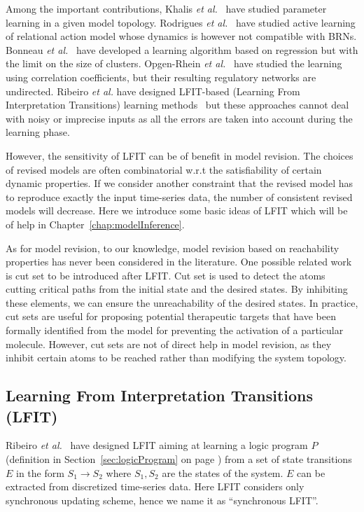 Among the important contributions, Khalis \textit{et al.}~\cite{khalis2009smbionet} have studied parameter learning in a given model topology.
Rodrigues \textit{et al.}~\cite{rodrigues2011active} have studied active learning of relational action model whose dynamics is however not compatible with BRNs.
Bonneau \textit{et al.}~\cite{bonneau2006inferelator} have developed a learning algorithm based on regression but with the limit on the size of clusters.
Opgen-Rhein \textit{et al.}~\cite{opgen2007correlation} have studied the learning using correlation coefficients, but their resulting regulatory networks are undirected. 
Ribeiro \textit{et al.} have designed LFIT-based (Learning From Interpretation Transitions) learning methods~\cite{ribeiro2015learning,ribeiro2018learning,ribeiro2017inductive} but these approaches cannot deal with noisy or imprecise inputs as all the errors are taken into account during the learning phase.

However, the sensitivity of LFIT can be of benefit in model revision.
The choices of revised models are often combinatorial w.r.t the satisfiability of certain dynamic properties.
If we consider another constraint that the revised model has to reproduce exactly the input time-series data, the number of consistent revised models will decrease.
Here we introduce some basic ideas of LFIT which will be of help in Chapter~\ref{chap:modelInference}.

As for model revision, to our knowledge, model revision based on reachability properties has never been considered in the literature.
One possible related work is cut set to be introduced after LFIT.
Cut set is used to detect the atoms cutting critical paths from the initial state and the desired states.
By inhibiting %
these elements, we can ensure the unreachability of the desired states.
In practice, cut sets are useful for proposing potential therapeutic targets that have been formally identified from the model for preventing the activation of a particular molecule.
However, cut sets are not of direct help in model revision, as they inhibit certain atoms to be reached rather than modifying the system topology.

\subsection{Learning From Interpretation Transitions (LFIT)}\label{sec:lfitSyn}
Ribeiro \textit{et al.}~\cite{ribeiro2015learning} have designed LFIT %
aiming at learning a logic program $P$ (definition in Section~\ref{sec:logicProgram} on page \pageref{sec:logicProgram}) from a set of state transitions $E$ in the form $S_1\to S_2$ where $S_1,S_2$ are the states of the system.
$E$ can be extracted from discretized time-series data.
Here LFIT considers only synchronous updating scheme, hence we name it as ``synchronous LFIT''.

